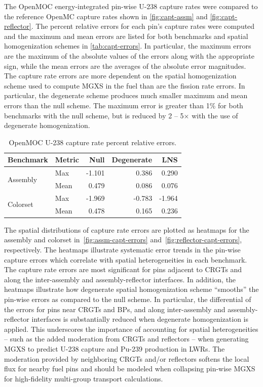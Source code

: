 The OpenMOC energy-integrated pin-wise U-238 capture rates were compared to the reference OpenMC capture rates shown in \autoref{fig:capt-assm} and \autoref{fig:capt-reflector}. The percent relative errors for each pin's capture rates were computed and the maximum and mean errors are listed for both benchmarks and spatial homogenization schemes in \autoref{tab:capt-errors}. In particular, the maximum errors are the maximum of the absolute values of the errors along with the appropriate sign, while the mean errors are the averages of the absolute error magnitudes. The capture rate errors are more dependent on the spatial homogenization scheme used to compute MGXS in the fuel than are the fission rate errors. In particular, the degenerate scheme produces much smaller maximum and mean errors than the null scheme. The maximum error is greater than 1\% for both benchmarks with the null scheme, but is reduced by 2 -- 5$\times$ with the use of degenerate homogenization.

\begin{table}[h!]
  \centering
  \caption{OpenMOC U-238 capture rate percent relative errors.}
  \label{tab:capt-errors} 
  \begin{tabular}{l l r r r}
  \toprule
  \textbf{Benchmark} & \textbf{Metric} & \textbf{Null} & \textbf{Degenerate} & \textbf{LNS} \\
  \midrule
  \multirow{2}{*}{Assembly} & Max  & -1.101 &  0.386 & 0.290 \\
                            & Mean &  0.479 &  0.086 & 0.076 \\
  \midrule
  \multirow{2}{*}{Colorset} & Max  & -1.969 & -0.783 & -1.964 \\
                            & Mean &  0.478 &  0.165 & 0.236 \\
  \bottomrule
\end{tabular}
\end{table}

The spatial distributions of capture rate errors are plotted as heatmaps for the assembly and colorset in~\autoref{fig:assm-capt-errors} and~\autoref{fig:reflector-capt-errors}, respectively. The heatmaps illustrate systematic error trends in the pin-wise capture errors which correlate with spatial heterogeneities in each benchmark. The capture rate errors are most significant for pins adjacent to CRGTs and along the inter-assembly and assembly-reflector interfaces. In addition, the heatmaps illustrate how degenerate spatial homogenization scheme ``smooths'' the pin-wise errors as compared to the null scheme. In particular, the differential of the errors for pins near CRGTs and BPs, and along inter-assembly and assembly-reflector interfaces is substantially reduced when degenerate homogenization is applied. This underscores the importance of accounting for spatial heterogeneities -- such as the added moderation from CRGTs and reflectors -- when generating MGXS to predict U-238 capture and Pu-239 production in LWRs. The moderation provided by neighboring CRGTs and/or reflectors softens the local flux for nearby fuel pins and should be modeled when collapsing pin-wise MGXS for high-fidelity multi-group transport calculations.

